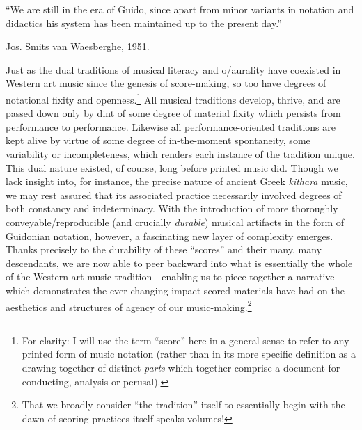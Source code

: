 

\epigraph{\singlespacing ``We are still in the era of Guido, since apart from minor variants in notation and didactics his system has been maintained up to the present day.''}{Jos. Smits van Waesberghe, 1951.}

    
    Just as the dual traditions of musical literacy and o/aurality have coexisted in Western art music since the genesis of score-making, so too have degrees of notational fixity and openness.\footnote{For clarity: I will use the term ``score'' here in a general sense to refer to any printed form of music notation (rather than in its more specific definition as a drawing together of distinct \textit{parts} which together comprise a document for conducting, analysis or perusal).} All musical traditions develop, thrive, and are passed down only by dint of some degree of material fixity which persists from performance to performance. Likewise all performance-oriented traditions are kept alive by virtue of some degree of in-the-moment spontaneity, some variability or incompleteness, which renders each instance of the tradition unique. This dual nature existed, of course, long before printed music did. Though we lack insight into, for instance, the precise nature of ancient Greek \textit{kithara} music, we may rest assured that its associated practice necessarily involved degrees of both constancy and indeterminacy. With the introduction of more thoroughly conveyable/reproducible (and crucially \textit{durable}) musical artifacts in the form of Guidonian notation, however, a fascinating new layer of complexity emerges. Thanks precisely to the durability of these ``scores'' and their many, many descendants, we are now able to peer backward into what is essentially the whole of the Western art music tradition---enabling us to piece together a narrative which demonstrates the ever-changing impact scored materials have had on the aesthetics and structures of agency of our music-making.\footnote{That we broadly consider ``the tradition'' itself to essentially begin with the dawn of scoring practices itself speaks volumes!}


